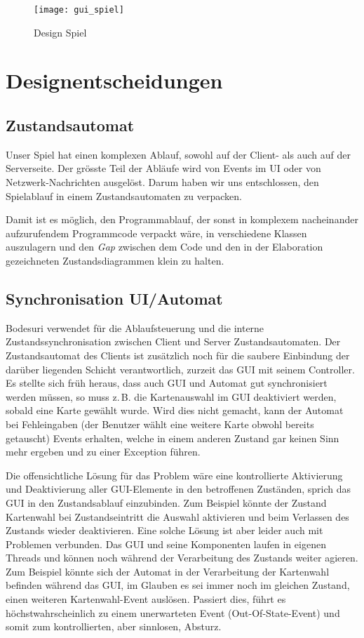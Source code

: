 \documentclass[12pt,halfparskip]{scrartcl}
\begin{document}
\begin{figure}[h]
	\centering
	\texttt{[image: gui\_spiel]}
	\caption{Design Spiel}
	\label{fig:gui_spiel}
\end{figure}

\clearpage
\section{Designentscheidungen}

\subsection{Zustandsautomat}
Unser Spiel hat einen komplexen Ablauf, sowohl auf der Client- als auch auf der Serverseite. Der grösste Teil der Abläufe wird von Events im UI oder von Netzwerk-Nachrichten ausgelöst. Darum haben wir uns entschlossen, den Spielablauf in einem Zustandsautomaten zu verpacken.

Damit ist es möglich, den Programmablauf, der sonst in komplexem nacheinander aufzurufendem Programmcode verpackt wäre, in verschiedene Klassen auszulagern und den \emph{Gap} zwischen dem Code und den in der Elaboration gezeichneten Zustandsdiagrammen klein zu halten.

\subsection{Synchronisation UI/Automat}

Bodesuri verwendet für die Ablaufsteuerung und die interne Zustandssynchronisation zwischen Client und Server Zustandsautomaten. Der Zustandsautomat des Clients ist zusätzlich noch für die saubere Einbindung der darüber liegenden Schicht verantwortlich, zurzeit das GUI mit seinem Controller. Es stellte sich früh heraus, dass auch GUI und Automat gut synchronisiert werden müssen, so muss z.\,B. die Kartenauswahl im GUI deaktiviert werden, sobald eine Karte gewählt wurde. Wird dies nicht gemacht, kann der Automat bei Fehleingaben (der Benutzer wählt eine weitere Karte obwohl bereits getauscht) Events erhalten, welche in einem anderen Zustand gar keinen Sinn mehr ergeben und zu einer Exception führen.

Die offensichtliche Lösung für das Problem wäre eine kontrollierte Aktivierung und Deaktivierung aller GUI-Elemente in den betroffenen Zuständen, sprich das GUI in den Zustandsablauf einzubinden. Zum Beispiel könnte der Zustand Kartenwahl bei Zustandseintritt die Auswahl aktivieren und beim Verlassen des Zustands wieder deaktivieren. Eine solche Lösung ist aber leider auch mit Problemen verbunden. Das GUI und seine Komponenten laufen in eigenen Threads und können noch während der Verarbeitung des Zustands weiter agieren. Zum Beispiel könnte sich der Automat in der Verarbeitung der Kartenwahl befinden während das GUI, im Glauben es sei immer noch im gleichen Zustand, einen weiteren Kartenwahl-Event auslösen. Passiert dies, führt es höchstwahrscheinlich zu einem unerwarteten Event (Out-Of-State-Event) und somit zum kontrollierten, aber sinnlosen, Absturz.
\end{document}
